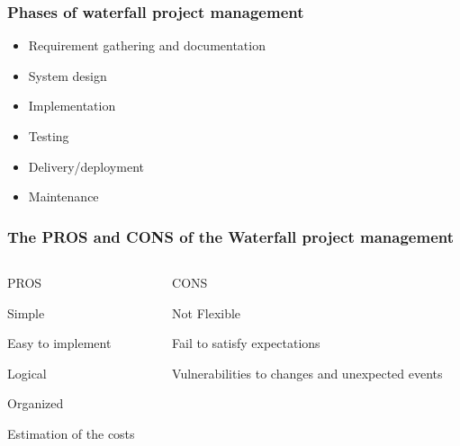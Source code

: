 \documentclass{beamer}
\begin{document}
\begin{frame}
    \frametitle{Phases of waterfall project management}
    \begin{itemize}
        \setlength\itemsep{1em}
        \item Requirement gathering and documentation \pause
        \item System design \pause
        \item Implementation \pause
        \item Testing \pause
        \item Delivery/deployment \pause
        \item Maintenance
    \end{itemize}
\end{frame}

\begin{frame}
    
    \frametitle{The PROS and CONS of the Waterfall project management}
    \begin{itemize}
    \begin{columns}[T] %
        \begin{column}{.48\textwidth}
        PROS \pause
        \item Simple 
        \item Easy to implement 
        \item Logical 
        \item Organized 
        \item Estimation of the costs 
        \end{column}%
        \hfill%
        \begin{column}{.48\textwidth}
        CONS \pause
        \item Not Flexible
        \item Fail to satisfy expectations 
        \item Vulnerabilities to changes and unexpected events
        \end{column}%
        \end{columns}   
        \setlength\itemsep{1em}
        
        
    \end{itemize}
\end{frame}
\end{document}
